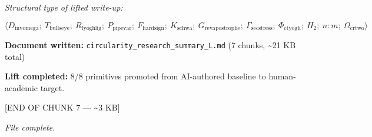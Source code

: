 \documentclass[12pt,a4paper]{article}
\begin{document}
\emph{Structural type of lifted write-up:}


\[\langle D_{\text{invomega}};\ T_{\text{bullseye}};\ R_{\text{lyoghlig}};\ P_{\text{pipevar}};\ F_{\text{hardsign}};\ K_{\text{schwa}};\ G_{\text{revapostrophe}};\ \Gamma_{\text{secstress}};\ \Phi_{\text{ctyogh}};\ H_2;\ n{:}m;\ \Omega_{\text{crtwo}} \rangle\]

\textbf{Document written:} \texttt{circularity\_research\_summary\_L.md} (7 chunks, \textasciitilde{}21 KB total)

\textbf{Lift completed:} 8/8 primitives promoted from AI-authored baseline to human-academic target.

{[}END OF CHUNK 7 --- \textasciitilde{}3 KB{]}

\emph{File complete.}
\end{document}
